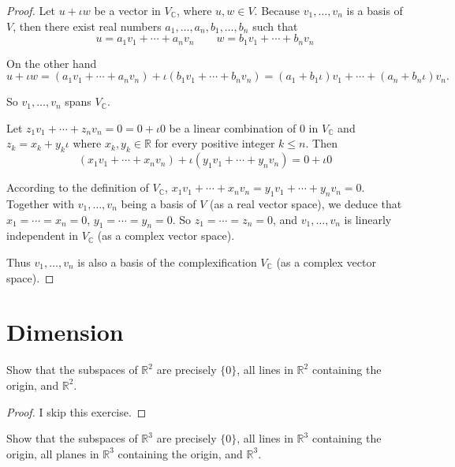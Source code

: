 \begin{proof}
    Let $u + \iota w$ be a vector in $V_{\mathbb{C}}$, where $u, w\in V$. Because $v_{1}, \ldots, v_{n}$ is a basis of $V$, then there exist real numbers $a_{1}, \ldots, a_{n}, b_{1}, \ldots, b_{n}$ such that
    \[
        u = a_{1}v_{1} + \cdots + a_{n}v_{n}\qquad w = b_{1}v_{1} + \cdots + b_{n}v_{n}
    \]

    On the other hand
    \[
        u + \iota w = (a_{1}v_{1} + \cdots + a_{n}v_{n}) + \iota (b_{1}v_{1} + \cdots + b_{n}v_{n}) = (a_{1} + b_{1}\iota) v_{1} + \cdots + (a_{n} + b_{n}\iota) v_{n}.
    \]

    So $v_{1}, \ldots, v_{n}$ spans $V_{\mathbb{C}}$.

    Let $z_{1}v_{1} + \cdots + z_{n}v_{n} = 0 = 0 + \iota 0$ be a linear combination of $0$ in $V_{\mathbb{C}}$ and $z_{k} = x_{k} + y_{k}\iota$ where $x_{k}, y_{k}\in\mathbb{R}$ for every positive integer $k\leq n$. Then
    \[
        (x_{1}v_{1} + \cdots + x_{n}v_{n}) + \iota (y_{1}v_{1} + \cdots + y_{n}v_{n}) = 0 + \iota 0
    \]

    According to the definition of $V_{\mathbb{C}}$, $x_{1}v_{1} + \cdots + x_{n}v_{n} = y_{1}v_{1} + \cdots + y_{n}v_{n} = 0$. Together with $v_{1}, \ldots, v_{n}$ being a basis of $V$ (as a real vector space), we deduce that $x_{1} = \cdots = x_{n} = 0$, $y_{1} = \cdots = y_{n} = 0$. So $z_{1} = \cdots = z_{n} = 0$, and $v_{1}, \ldots, v_{n}$ is linearly independent in $V_{\mathbb{C}}$ (as a complex vector space).

    Thus $v_{1}, \ldots, v_{n}$ is also a basis of the complexification $V_{\mathbb{C}}$ (as a complex vector space).
\end{proof}

\section{Dimension}

\begin{exercise}
    Show that the subspaces of $\mathbb{R}^{2}$ are precisely $\{0\}$, all lines in $\mathbb{R}^{2}$ containing the origin, and $\mathbb{R}^{2}$.
\end{exercise}

\begin{proof}
    I skip this exercise.
\end{proof}

\begin{exercise}
    Show that the subspaces of $\mathbb{R}^{3}$ are precisely $\{0\}$, all lines in $\mathbb{R}^{3}$ containing the origin, all planes in $\mathbb{R}^{3}$ containing the origin, and $\mathbb{R}^{3}$.
\end{exercise}

